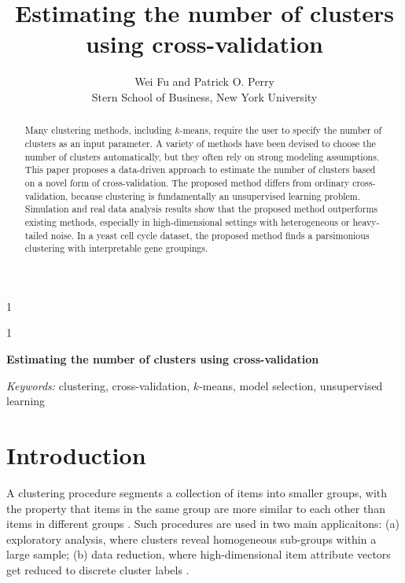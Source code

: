\documentclass[12pt]{article}
\newcommand{\blind}{1}
\begin{document}
%

\def\spacingset#1{\renewcommand{\baselinestretch}%
{#1}\small\normalsize} \spacingset{1}



\blind
{
  \title{\bf Estimating the number of clusters using cross-validation}
  \author{Wei Fu and Patrick O. Perry \\
  Stern School of Business, New York University}
  \maketitle
} \fi

\blind
{
  \bigskip
  \bigskip
  \bigskip
  \begin{center}
    {\LARGE\bf Estimating the number of clusters using cross-validation}
\end{center}
  \medskip
} \fi

\bigskip
\begin{abstract}
Many clustering methods, including $k$-means, require the user to specify the
number of clusters as an input parameter. A variety of methods have been
devised to choose the number of clusters automatically, but they often rely on
strong modeling assumptions. This paper proposes a data-driven approach to
estimate the number of clusters based on a novel form of cross-validation. The
proposed method differs from ordinary cross-validation, because clustering is
fundamentally an unsupervised learning problem. Simulation and real data
analysis results show that the proposed method outperforms existing methods,
especially in high-dimensional settings with heterogeneous or heavy-tailed
noise. In a yeast cell cycle dataset, the proposed method finds a parsimonious
clustering with interpretable gene groupings.
\end{abstract}

\noindent%
{\it Keywords:} clustering, cross-validation, $k$-means, model selection, unsupervised learning
\vfill

\newpage
\spacingset{1.45} %
\section{Introduction}
\label{sec:intro}

A clustering procedure segments a collection of items into smaller groups,
with the property that items in the same group are more similar to each other
than items in different groups \citep{hartigan1975clustering}.  Such
procedures are used in two main applicaitons: (a) exploratory analysis, where clusters
reveal homogeneous sub-groups within a large sample; (b) data
reduction, where high-dimensional item attribute vectors get reduced to discrete
cluster labels \citep{jain1999data}.
\end{document}
